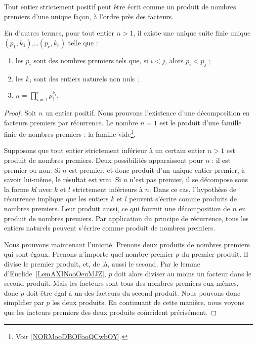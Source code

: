 \begin{theorem}        \label{ThoAJFJooAveRvY}
	Tout entier strictement positif peut être écrit comme un produit de nombres premiers d'une unique façon, à l'ordre près des facteurs.

	En d'autres termes, pour tout entier \( n>1\), il existe une unique suite finie unique \( (p_1, k_1)\),\ldots \( (p_r, k_r)\) telle que :
	\begin{enumerate}
		\item
		      les \( p_i\) sont des nombres premiers tels que, si \( i < j\), alors \( p_i < p_j\) ;
		\item
		      les \( k_i\) sont des entiers naturels non nuls ;
		\item
		      \( n=\prod_{i=1}^rp_i^{k_i}\).
	\end{enumerate}
\end{theorem}

\begin{proof}
	Soit \( n\) un entier positif. Nous prouvons l'existence d'une décomposition en facteurs premiers par récurrence. Le nombre \( n=1\) est le produit d'une famille finie de nombres premiers : la famille vide\footnote{Voir \ref{NORMooDBOFooQCwbOY}.}.

	Supposons que tout entier strictement inférieur à un certain entier \( n>1\) est produit de nombres premiers. Deux possibilités apparaissent pour \( n\) : il est premier ou non. Si \( n\) est premier, et donc produit d'un unique entier premier, à savoir lui-même, le résultat est vrai. Si \( n\) n'est pas premier, il se décompose sous la forme \( kl\) avec \( k\) et \( l\) strictement inférieurs à \( n\). Dans ce cas, l'hypothèse de récurrence implique que les entiers \( k\) et \( l\) peuvent s'écrire comme produits de nombres premiers. Leur produit aussi, ce qui fournit une décomposition de \( n\) en produit de nombres premiers. Par application du principe de récurrence, tous les entiers naturels peuvent s'écrire comme produit de nombres premiers.

	Nous prouvons maintenant l'unicité. Prenons deux produits de nombres premiers qui sont égaux. Prenons n'importe quel nombre premier \( p\) du premier produit. Il divise le premier produit, et, de là, aussi le second. Par le lemme d'Euclide~\ref{LemAXINooOeuMJZ}, \( p\) doit alors diviser au moins un facteur dans le second produit. Mais les facteurs sont tous des nombres premiers eux-mêmes, donc \( p\) doit être égal à un des facteurs du second produit. Nous pouvons donc simplifier par \( p\) les deux produits. En continuant de cette manière, nous voyons que les facteurs premiers des deux produits coïncident précisément.
\end{proof}

